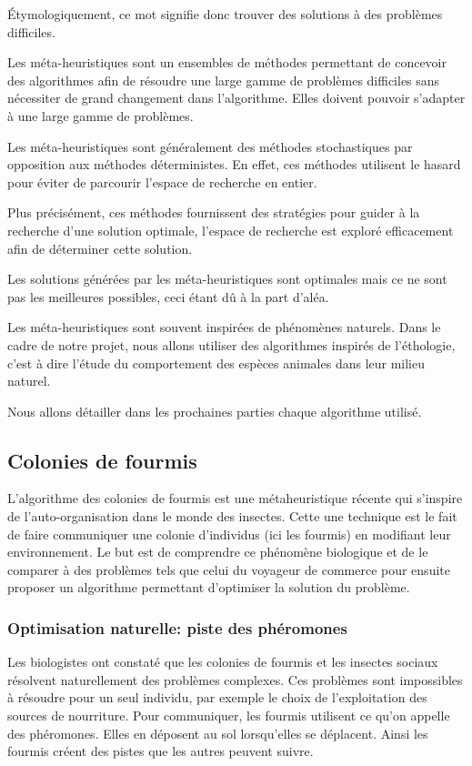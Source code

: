 \documentclass[12pt]{article}
\begin{document}
Étymologiquement, ce mot signifie donc trouver des solutions à des problèmes difficiles. 

Les méta-heuristiques sont un ensembles de méthodes permettant de concevoir des algorithmes afin de résoudre une large gamme de problèmes difficiles sans nécessiter de grand changement dans l'algorithme. Elles doivent pouvoir s'adapter à une large gamme de problèmes. 


Les méta-heuristiques sont généralement des méthodes stochastiques par opposition aux méthodes déterministes. En effet, ces méthodes utilisent le hasard pour éviter de parcourir l'espace de recherche en entier. 

Plus précisément, ces méthodes fournissent des stratégies pour guider à la recherche d'une solution optimale, l'espace de recherche est exploré efficacement afin de déterminer cette solution. 

Les solutions générées par les méta-heuristiques sont optimales mais ce ne sont pas les meilleures possibles, ceci étant dû à la part d'aléa.

Les méta-heuristiques sont souvent inspirées de phénomènes naturels. Dans le cadre de notre projet, nous allons  utiliser des algorithmes inspirés de l'éthologie, c'est à dire l'étude du comportement des espèces animales dans leur milieu naturel. 

Nous allons détailler dans les prochaines parties chaque algorithme utilisé. 



\subsection{Colonies de fourmis \cite{fourmis}}

L'algorithme des colonies de fourmis est une métaheuristique récente qui s'inspire de l'auto-organisation dans le monde des insectes. Cette une technique est le fait de faire communiquer une colonie d'individus (ici les fourmis) en modifiant leur environnement. Le but est de comprendre ce phénomène biologique et de le comparer à des problèmes tels que celui du voyageur de commerce pour ensuite proposer un algorithme permettant d'optimiser la solution du problème.

\subsubsection{Optimisation naturelle: piste des phéromones}
	Les biologistes ont constaté que les colonies de fourmis et les insectes sociaux résolvent naturellement des problèmes complexes. Ces problèmes sont impossibles à résoudre pour un seul individu, par exemple le choix de l'exploitation des sources de nourriture. Pour communiquer, les fourmis utilisent ce qu'on appelle des phéromones. Elles en déposent au sol lorsqu'elles se déplacent. Ainsi les fourmis créent des pistes que les autres peuvent suivre.
    
\end{document}
